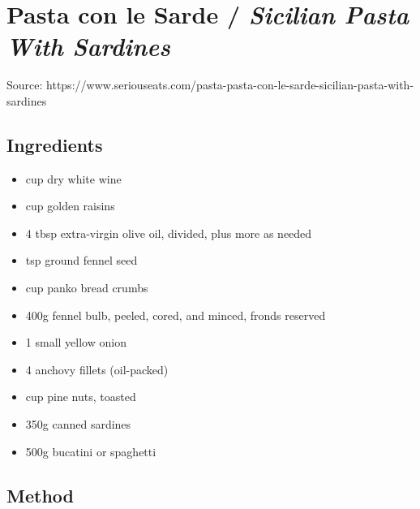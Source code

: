 \section{Pasta con le Sarde / \emph{Sicilian Pasta With Sardines}}


Source: https://www.seriouseats.com/pasta-pasta-con-le-sarde-sicilian-pasta-with-sardines

\subsection{Ingredients}

\begin{itemize}
    \item {} cup dry white wine
    \item {} cup golden raisins
    \item 4 tbsp extra-virgin olive oil, divided, plus more as needed
    \item {} tsp ground fennel seed
    \item {} cup panko bread crumbs
    \item 400g fennel bulb, peeled, cored, and minced, fronds reserved
    \item 1 small yellow onion
    \item 4 anchovy fillets (oil-packed)
    \item {} cup pine nuts, toasted
    \item 350g canned sardines
    \item 500g bucatini or spaghetti
\end{itemize}

\subsection{Method}


